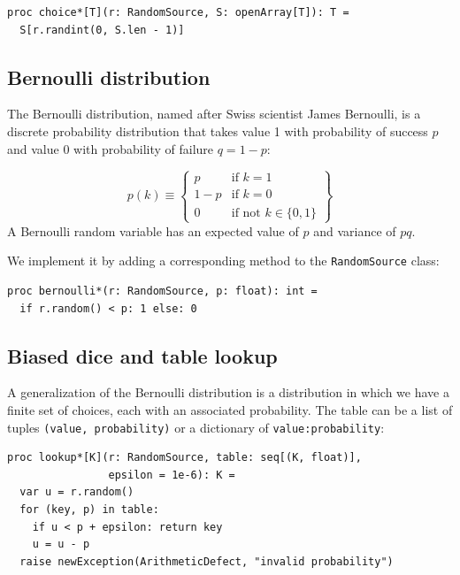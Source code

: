 \documentclass[justified, sixbynine]{tufte-book}
\def\ft{\small\tt}
\theoremstyle{plain}%
\newtheorem * {corollary}{Corollary}
\theoremstyle{definition}
\theoremstyle{remark}
\newtheorem * {remark}{Remark}
\newtheorem * {note}{Note}
\begin{document}
\begin{fullwidth}
\begin{lstlisting}[caption={in file: {\ft nlib/randomgen.nim}}]
proc choice*[T](r: RandomSource, S: openArray[T]): T =
  S[r.randint(0, S.len - 1)]
\end{lstlisting}

\goodbreak\subsection{Bernoulli distribution}

The Bernoulli distribution, named after Swiss scientist James Bernoulli, is
a discrete probability distribution that takes value 1 with
probability of success $p$ and value 0 with probability of failure $q=1-p$:

\begin{equation}
p(k) \equiv \left\{
\begin{array}{ll}
p & \text{if }k=1 \\
1-p & \text{if }k=0 \\
0 & \text{if not }k \in \{0, 1\}
\end{array}
\right\}
\end{equation}
A Bernoulli random variable has an expected value of $p$ and variance of $pq$.

We implement it by adding a corresponding method to the {\ft RandomSource} class:

\begin{lstlisting}[caption={in file: {\ft nlib/randomgen.nim}}]
proc bernoulli*(r: RandomSource, p: float): int =
  if r.random() < p: 1 else: 0
\end{lstlisting}

\goodbreak\subsection{Biased dice and table lookup}

A generalization of the Bernoulli distribution is a distribution in which we have a finite set of choices, each with an associated probability. The table can be a list of tuples {\ft (value, probability)} or a dictionary of {\ft value:probability}:

\begin{lstlisting}[caption={in file: {\ft nlib/randomgen.nim}}]
proc lookup*[K](r: RandomSource, table: seq[(K, float)],
                epsilon = 1e-6): K =
  var u = r.random()
  for (key, p) in table:
    if u < p + epsilon: return key
    u = u - p
  raise newException(ArithmeticDefect, "invalid probability")
\end{lstlisting}


\end{fullwidth}
\end{document}
